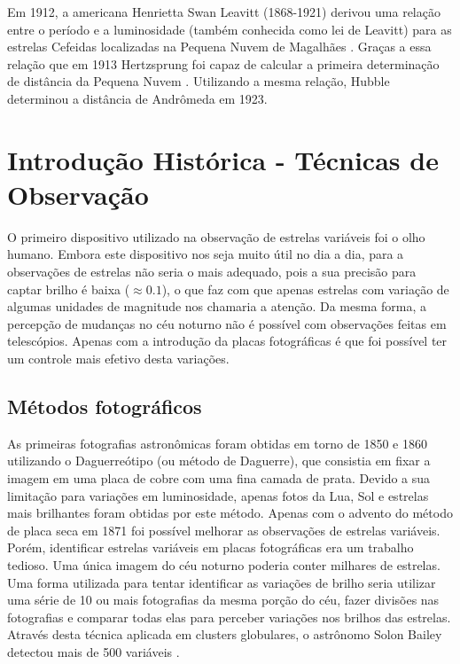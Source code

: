 Em 1912, a americana Henrietta Swan Leavitt (1868-1921) derivou uma relação entre o período e a luminosidade (também conhecida como lei de Leavitt) para as estrelas Cefeidas localizadas na Pequena Nuvem de Magalhães \citep{Leavitt1912}. Graças a essa relação que em 1913 Hertzsprung foi capaz de calcular a primeira determinação de distância da Pequena Nuvem \citep{Hertzsprung1913}. Utilizando a mesma relação, Hubble determinou a distância de Andrômeda em 1923.


\section{Introdução Histórica - Técnicas de Observação}

O primeiro dispositivo utilizado na observação de estrelas variáveis foi o olho humano. 
Embora este dispositivo nos seja muito útil no dia a dia, para a observações de estrelas não seria o mais adequado, pois a sua precisão para captar brilho é baixa ($\approx 0.1$), o que faz com que apenas estrelas com variação de algumas unidades de magnitude nos chamaria a atenção. Da mesma forma, a percepção de mudanças no céu noturno não é possível com observações feitas em telescópios. Apenas com a introdução da placas fotográficas é que foi possível ter um controle mais efetivo desta variações. 

\subsection{Métodos fotográficos}

As primeiras fotografias astronômicas foram obtidas em torno de 1850 e 1860 utilizando o Daguerreótipo (ou método de Daguerre), que consistia em fixar a imagem em uma placa de cobre com uma fina camada de prata. Devido a sua limitação para variações em luminosidade, apenas fotos da Lua, Sol e estrelas mais brilhantes foram obtidas por este método. Apenas com o advento do método de placa seca em 1871 foi possível melhorar as observações de estrelas variáveis. Porém, identificar estrelas variáveis em placas fotográficas era um trabalho tedioso. Uma única imagem do céu noturno poderia conter milhares de estrelas. Uma forma utilizada para tentar identificar as variações de brilho seria utilizar uma série de 10 ou mais fotografias da mesma porção do céu, fazer divisões nas fotografias e comparar todas elas para perceber variações nos brilhos das estrelas. Através desta técnica aplicada em clusters globulares, o astrônomo Solon Bailey detectou mais de 500 variáveis \citep{Bailey1902}.

